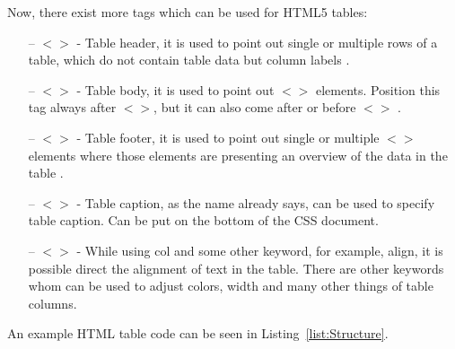 Now, there exist more tags which can be used for HTML5 tables:
\begin{itemize}
    \item[--] $<$$>$ - Table header, it is used to point
out single or multiple rows of a table, which do not contain table
data but column labels \parencite{ChrisCoyier}.

    \item[--] $<$$>$ - Table body, it is used to point
out $<$$>$ elements. Position this tag always after
$<$$>$, but it can also come after or before
$<$$>$ \parencite{ChrisCoyier}.

    \item[--] $<$$>$ - Table footer, it is used to point
out single or multiple $<$$>$ elements where those elements
are presenting an overview  of the data in the table
\parencite{ChrisCoyier}.

    \item[--] $<$$>$ - Table caption, as the name
already says, can be used to specify table caption. Can be put on the
bottom of the CSS document.

    \item[--] $<$$>$ - While using col and some other
keyword, for example, align, it is possible direct the alignment of
text in the table. There are other keywords whom can be used to adjust
colors, width and many other things of table columns.
\end{itemize}

An example HTML table code can be seen in Listing~\ref{list:Structure}.
